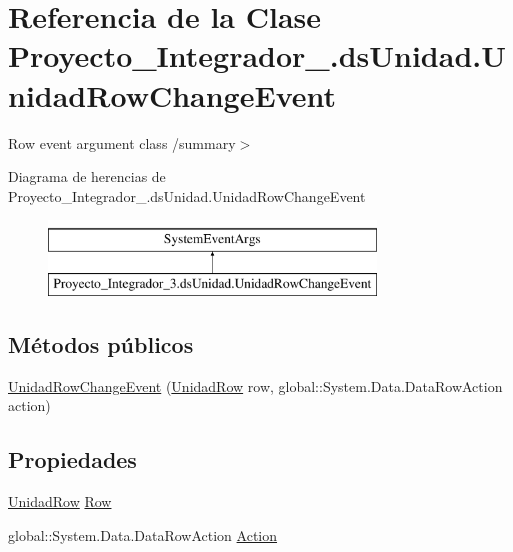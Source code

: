 \hypertarget{class_proyecto___integrador__3_1_1ds_unidad_1_1_unidad_row_change_event}{\section{Referencia de la Clase Proyecto\-\_\-\-Integrador\-\_.\-ds\-Unidad.\-Unidad\-Row\-Change\-Event}
\label{class_proyecto___integrador__3_1_1ds_unidad_1_1_unidad_row_change_event}
}


Row event argument class /summary$>$  


Diagrama de herencias de Proyecto\-\_\-\-Integrador\-\_.\-ds\-Unidad.\-Unidad\-Row\-Change\-Event\begin{figure}[H]
\begin{center}
\leavevmode
\includegraphics[height=2.000000cm]{d9/d2c/class_proyecto___integrador__3_1_1ds_unidad_1_1_unidad_row_change_event}
\end{center}
\end{figure}
\subsection*{Métodos públicos}
\begin{DoxyCompactItemize}
\item 
\hyperlink{class_proyecto___integrador__3_1_1ds_unidad_1_1_unidad_row_change_event_a983286d7404a2282f261e7688b4e6381}{Unidad\-Row\-Change\-Event} (\hyperlink{class_proyecto___integrador__3_1_1ds_unidad_1_1_unidad_row}{Unidad\-Row} row, global\-::\-System.\-Data.\-Data\-Row\-Action action)
\end{DoxyCompactItemize}
\subsection*{Propiedades}
\begin{DoxyCompactItemize}
\item 
\hyperlink{class_proyecto___integrador__3_1_1ds_unidad_1_1_unidad_row}{Unidad\-Row} \hyperlink{class_proyecto___integrador__3_1_1ds_unidad_1_1_unidad_row_change_event_a0eb95b09cacaa2e7b7d252f9b999294e}{Row}
\item 
global\-::\-System.\-Data.\-Data\-Row\-Action \hyperlink{class_proyecto___integrador__3_1_1ds_unidad_1_1_unidad_row_change_event_a326a7a9bbe63c16a3ee916456873039e}{Action}
\end{DoxyCompactItemize}
